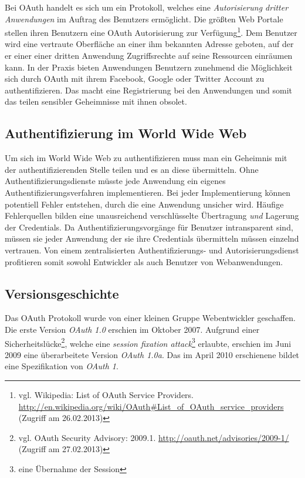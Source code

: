 \documentclass[12pt,a4paper,pointednumbers,abstracton]{scrartcl}
\begin{document}
Bei OAuth handelt es sich um ein Protokoll, welches eine \emph{Autorisierung dritter Anwendungen} im Auftrag des Benutzers ermöglicht.
Die größten Web Portale stellen ihren Benutzern eine OAuth Autorisierung zur Verfügung\footnote{vgl. Wikipedia: List of OAuth Service Providers. \url{http://en.wikipedia.org/wiki/OAuth\#List_of_OAuth_service_providers} (Zugriff am 26.02.2013)}.
Dem Benutzer wird eine vertraute Oberfläche an einer ihm bekannten Adresse geboten, auf der er einer einer dritten Anwendung Zugriffsrechte auf seine Ressourcen einräumen kann.
In der Praxis bieten Anwendungen Benutzern zunehmend die Möglichkeit sich durch OAuth mit ihrem Facebook, Google oder Twitter Account zu authentifizieren.
Das macht eine Registrierung bei den Anwendungen und somit das teilen sensibler Geheimnisse mit ihnen obsolet.

\subsection{Authentifizierung im World Wide Web}

Um sich im World Wide Web zu authentifizieren muss man ein Geheimnis mit der authentifizierenden Stelle teilen und es an diese übermitteln.
Ohne Authentifizierungsdienste müsste jede Anwendung ein eigenes Authentifizierungsverfahren implementieren.
Bei jeder Implementierung können potentiell Fehler entstehen, durch die eine Anwendung unsicher wird.
Häufige Fehlerquellen bilden eine unausreichend verschlüsselte Übertragung \emph{und} Lagerung der Credentials.
Da Authentifizierungsvorgänge für Benutzer intransparent sind, müssen sie jeder Anwendung der sie ihre Credentials übermitteln müssen einzelnd vertrauen.
Von einem zentralisierten Authentifizierungs- und Autorisierungsdienst profitieren somit sowohl Entwickler als auch Benutzer von Webanwendungen.

\subsection{Versionsgeschichte}

Das OAuth Protokoll wurde von einer kleinen Gruppe Webentwickler geschaffen.
Die erste Version \emph{OAuth 1.0} erschien im Oktober 2007.
Aufgrund einer Sicherheitslücke\footnote{vgl. OAuth Security Advisory: 2009.1. \url{http://oauth.net/advisories/2009-1/} (Zugriff am 27.02.2013)}, welche eine \emph{session fixation attack}\footnote{eine Übernahme der Session} erlaubte, erschien im Juni 2009 eine überarbeitete Version \emph{OAuth 1.0a}.
Das im April 2010 erschienene \cite{RFC5849} bildet eine Spezifikation von \emph{OAuth 1}.
\end{document}
